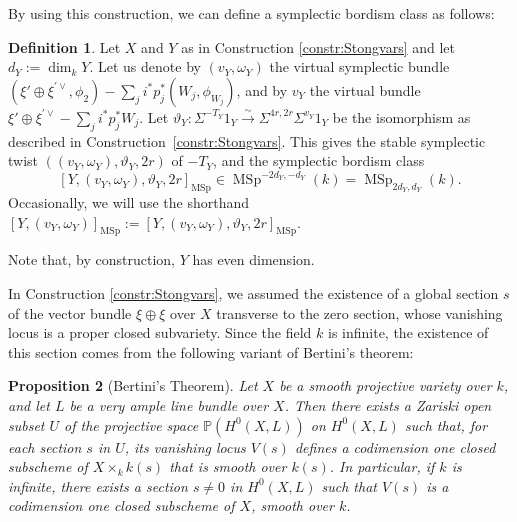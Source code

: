 \documentclass[10pt]{amsart}
\theoremstyle{definition}
\newtheorem{defn}{Definition}[section]
\theoremstyle{plain}
\newtheorem{prop}[defn]{Proposition}
\numberwithin{equation}{section}
\newcommand{\0}{\emptyset}
\newcommand{\MSp}{{\operatorname{MSp}}}
\renewcommand{\dim}{{\operatorname{dim}}}
\begin{document}
By using this construction, we can define a symplectic bordism class as follows:

\begin{defn}
\label{def:symplecticclasses}
Let $X$ and $Y$ as in Construction \ref{constr:Stongvars} and let $d_Y:=\dim_kY$. Let us denote by
$(v_Y,\omega_Y)$ the virtual symplectic bundle $(\xi'\oplus \xi^{\prime\vee},\phi_2)-\sum_ji^*p_j^*(W_j,\phi_{W_j})$, and by $v_Y$ the virtual bundle $\xi'\oplus \xi^{\prime\vee}-\sum_ji^*p_j^*W_j$. Let $\vartheta_Y:\Sigma^{-T_Y}1_Y\xrightarrow{\sim} \Sigma^{4r,2r}\Sigma^{v_Y}1_Y$ be the isomorphism as described in Construction~\ref{constr:Stongvars}. This gives the stable symplectic twist $((v_Y,\omega_Y), \vartheta_Y, 2r)$ of $-T_Y$, and the symplectic bordism class
\[
[Y, (v_Y,\omega_Y),\vartheta_Y, 2r]_\MSp\in \MSp^{-2d_Y, -d_Y}(k)=\MSp_{2d_Y, d_Y}(k).
\]
Occasionally, we will use the shorthand $[Y, (v_Y,\omega_Y)]_\MSp:=[Y, (v_Y,\omega_Y),\vartheta_Y, 2r]_\MSp$.
\end{defn}

Note that, by construction, $Y$ has even dimension.

In Construction \ref{constr:Stongvars}, we assumed the existence of a global section $s$ of the vector bundle $\xi \oplus \xi$ over $X$ transverse to the zero section, whose vanishing locus is a proper closed subvariety. Since the field $k$ is infinite, the existence of this section comes from the following variant of Bertini's theorem:

\begin{prop}[Bertini's Theorem]
\label{prop:BertiniThm}
    Let $X$ be a smooth projective variety over $k$, and let $L$ be a very ample line bundle over $X$. Then there exists a Zariski open subset $U$ of the projective space $\mathbb{P}(H^0(X,L))$ on $H^0(X,L)$ such that, for each section $s$ in $U$, its vanishing locus $V(s)$ defines a codimension one closed subscheme of $X \times_k k(s)$ that is smooth over $k(s)$. In particular, if $k$ is infinite, there exists a section $s \neq 0$ in $H^0(X,L)$ such that $V(s)$ is a codimension one closed subscheme of $X$, smooth over $k$.
\end{prop}
\end{document}
